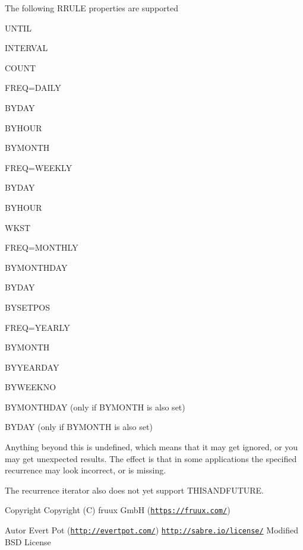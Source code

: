 The following R\+R\+U\+LE properties are supported
\begin{DoxyItemize}
\item U\+N\+T\+IL
\item I\+N\+T\+E\+R\+V\+AL
\item C\+O\+U\+NT
\item F\+R\+EQ=D\+A\+I\+LY
\begin{DoxyItemize}
\item B\+Y\+D\+AY
\item B\+Y\+H\+O\+UR
\item B\+Y\+M\+O\+N\+TH
\end{DoxyItemize}
\item F\+R\+EQ=W\+E\+E\+K\+LY
\begin{DoxyItemize}
\item B\+Y\+D\+AY
\item B\+Y\+H\+O\+UR
\item W\+K\+ST
\end{DoxyItemize}
\item F\+R\+EQ=M\+O\+N\+T\+H\+LY
\begin{DoxyItemize}
\item B\+Y\+M\+O\+N\+T\+H\+D\+AY
\item B\+Y\+D\+AY
\item B\+Y\+S\+E\+T\+P\+OS
\end{DoxyItemize}
\item F\+R\+EQ=Y\+E\+A\+R\+LY
\begin{DoxyItemize}
\item B\+Y\+M\+O\+N\+TH
\item B\+Y\+Y\+E\+A\+R\+D\+AY
\item B\+Y\+W\+E\+E\+K\+NO
\item B\+Y\+M\+O\+N\+T\+H\+D\+AY (only if B\+Y\+M\+O\+N\+TH is also set)
\item B\+Y\+D\+AY (only if B\+Y\+M\+O\+N\+TH is also set)
\end{DoxyItemize}
\end{DoxyItemize}

Anything beyond this is \textquotesingle{}undefined\textquotesingle{}, which means that it may get ignored, or you may get unexpected results. The effect is that in some applications the specified recurrence may look incorrect, or is missing.

The recurrence iterator also does not yet support T\+H\+I\+S\+A\+N\+D\+F\+U\+T\+U\+RE.

\begin{DoxyCopyright}{Copyright}
Copyright (C) fruux GmbH (\href{https://fruux.com/}{\tt https\+://fruux.\+com/}) 
\end{DoxyCopyright}
\begin{DoxyAuthor}{Autor}
Evert Pot (\href{http://evertpot.com/}{\tt http\+://evertpot.\+com/})  \href{http://sabre.io/license/}{\tt http\+://sabre.\+io/license/} Modified B\+SD License 
\end{DoxyAuthor}



